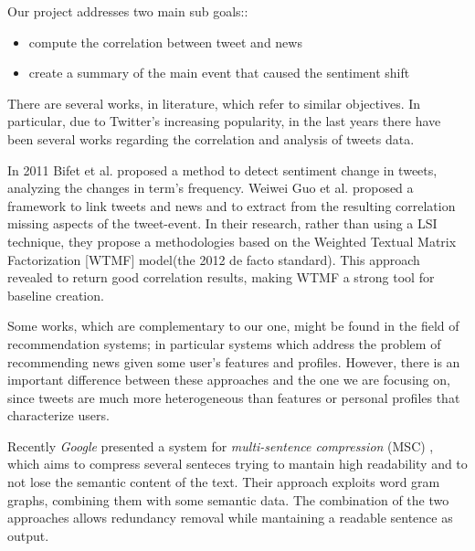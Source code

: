 Our project addresses two main sub goals::
\begin{itemize}
	\item compute the correlation between tweet and news
	\item create a summary of the main event that caused the sentiment shift
\end{itemize}


 
There are several works, in literature, which refer to similar objectives. In particular, due to Twitter’s increasing popularity, in the last years there have been several works regarding the correlation and analysis of tweets data. 
 
 
In 2011 Bifet et al. \cite{Bifet}proposed a method to detect sentiment change in tweets, analyzing the changes in term's frequency. 
Weiwei Guo et al.\cite{LTN} proposed a framework to link tweets and news and to extract from the resulting correlation missing aspects of the tweet-event.
In their research, rather than using a LSI technique, they propose a methodologies based on the Weighted Textual Matrix Factorization\cite{WTMF}
[WTMF] model(the 2012 de facto standard).
This approach revealed to return good correlation results, making WTMF a strong tool for baseline creation.

Some works, which are complementary to our one, might be found in the field of recommendation systems; in particular systems which address the problem of recommending news given some user’s features and profiles.
However, there is an important difference between these approaches and the one we are focusing on, since tweets are much more heterogeneous than features or personal profiles that characterize users. 

Recently \emph{Google} presented a system for \emph{multi-sentence compression} (MSC) \cite{MSC}, which aims
to compress several senteces trying to mantain high readability and to not lose
the semantic content of the text. Their approach exploits word gram graphs,
combining them with some semantic data. The combination of the two approaches
allows redundancy removal while mantaining a readable sentence as output.


